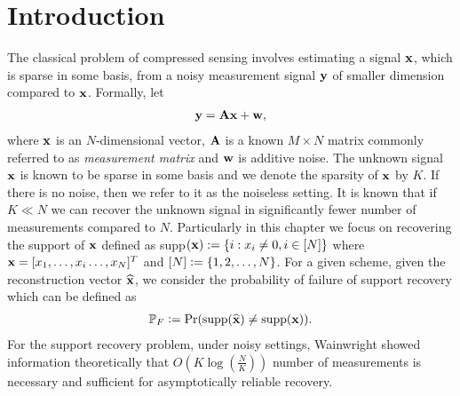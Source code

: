 
\section{Introduction}
The classical problem of compressed sensing involves estimating a signal $\mathbf{x}$, which is sparse in some basis, from a noisy measurement signal $\mathbf{y}$ of smaller dimension compared to $\mathbf{x}$. Formally, let
\begin{align*}
\mathbf{y=Ax+w},
\end{align*}
where $\mathbf{x}$ is an $N$-dimensional vector, $\mathbf{A}$ is a known $M \times N$ matrix commonly referred to as \emph{measurement matrix} and $\mathbf{w}$ is additive noise. The unknown signal $\mathbf{x}$ is known to be sparse in some basis and we denote the sparsity of $\mathbf{x}$ by $K$. If there is no noise, then we refer to it as the noiseless setting. It is known that if $K \ll N$ we can recover the unknown signal in significantly fewer number of measurements compared to $N$.  Particularly in this chapter we focus on recovering the support of $\mathbf{x}$ defined as supp$(\mathbf{x}):=\{i:x_i\neq 0, i\in[N]\}$ where $\mathbf{x}=[x_1,\ldots , x_i \ldots ,x_N]^{T}$ and $[N]\mathrel{\mathop:}=\{1,2,\ldots ,N\}$. For a given scheme, given the reconstruction vector $\widehat{\mathbf{x}}$, we consider the probability of failure of support recovery which can be defined as
\begin{align*}
\mathbb{P}_{F}\mathrel{\mathop:}=\mathrm{Pr}(\text{supp}(\widehat{\mathbf{x}})\neq \text{supp}(\mathbf{x})).
\end{align*}
 For the support recovery problem, under noisy settings, Wainwright \cite{wainwright2009information} showed information theoretically that $O\left(K\log(\frac{N}{K})\right)$ number of measurements is necessary and sufficient for asymptotically reliable recovery.

